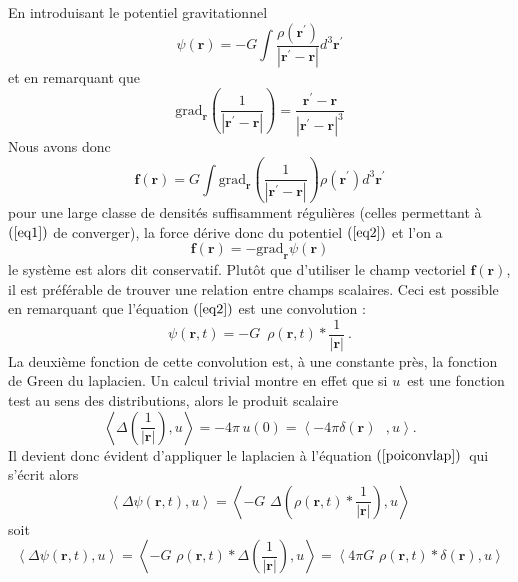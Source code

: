 {En introduisant le {potentiel} gravitationnel
\begin{equation}
\psi(\mathbf{r})=-G\displaystyle\int\frac{\rho(\mathbf{r}^{\prime}%
)}{\left\vert \mathbf{r}^{\prime}-\mathbf{r}\right\vert }d^{3}\mathbf{r}%
^{\prime}\label{eq2}%
\end{equation}
et en remarquant que
\[
\mathrm{grad}_{\mathbf{r}}\left(  \frac{1}{\left\vert \mathbf{r}^{\prime
}-\mathbf{r}\right\vert }\right)  =\frac{\mathbf{r}^{\prime}-\mathbf{r}%
}{\left\vert \mathbf{r}^{\prime}-\mathbf{r}\right\vert ^{3}}
\]
Nous avons donc
\[
\mathbf{f}(\mathbf{r})=G\displaystyle\int\mathrm{grad}_{\mathbf{r}}\left(
\frac{1}{\left\vert \mathbf{r}^{\prime}-\mathbf{r}\right\vert }\right)
\rho(\mathbf{r}^{\prime})d^{3}\mathbf{r}^{\prime}
\]
pour une large classe de densit\'{e}s suffisamment r\'{e}guli\`{e}res (celles
permettant \`{a} $\left(  \ref{eq1}\right)  $ de converger), la force
d\'{e}rive donc du {potentiel} $\left(  \ref{eq2}\right)  $ et l'on a
\begin{equation}
\mathbf{f}(\mathbf{r})=-\mathrm{grad}_{\mathbf{r}}\psi(\mathbf{r})\label{eq3}%
\end{equation}
le syst\`{e}me est alors dit conservatif. Plut\^{o}t que d'utiliser le champ
vectoriel $\mathbf{f}(\mathbf{r})$, il est pr\'{e}f\'{e}rable de trouver une
relation entre champs scalaires. Ceci est possible en remarquant que
l'\'{e}quation $\left(  \ref{eq2}\right)  $ est une {convolution} :}
\begin{equation}
\psi(\mathbf{r},t)=-G\,\,\,\rho(\mathbf{r},t)\ast\frac{1}{\left\vert
\mathbf{r}\right\vert }\ .\label{poiconvlap}%
\end{equation}
{La deuxi\`{e}me fonction de cette {convolution} est, \`{a} une constante
pr\`{e}s, la fonction de {Green} du laplacien. Un calcul trivial montre en
effet que si }$u${\ est une fonction test au sens des distributions, alors le
produit scalaire}
\[
\left\langle \Delta\left(  \frac{1}{\left\vert \mathbf{r}\right\vert }\right)
,u\right\rangle =-4\pi\,u\left(  0\right)  =\left\langle -4\pi\delta\left(
\mathbf{r}\right)  \text{ },u\right\rangle \text{.}
\]
{Il devient donc \'{e}vident d'appliquer le laplacien \`{a} l'\'{e}quation
}$\left(  \ref{poiconvlap}\right)  ${\ qui s'\'{e}crit alors}
\[
\left\langle \Delta\psi(\mathbf{r},t),u\right\rangle =\left\langle
-G\,\,\Delta\left(  \rho(\mathbf{r},t)\ast\frac{1}{\left\vert \mathbf{r}%
\right\vert }\right)  ,u\right\rangle
\]
{soit }
\[
\left\langle \Delta\psi(\mathbf{r},t),u\right\rangle =\left\langle
-G\,\,\rho(\mathbf{r},t)\ast\Delta\left(  \frac{1}{\left\vert \mathbf{r}%
\right\vert }\right)  ,u\right\rangle =\left\langle 4\pi G\,\,\rho
(\mathbf{r},t)\ast\delta\left(  \mathbf{r}\right)  ,u\right\rangle
\]


